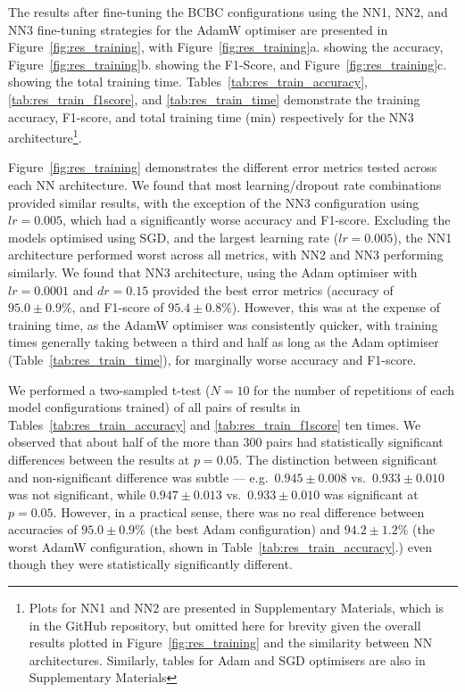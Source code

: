 \documentclass[a4paper,12pt]{article}
\begin{document}
The results after fine-tuning the \ac{BCBC} configurations using the \ac{NN1}, \ac{NN2}, and \ac{NN3} fine-tuning strategies for the AdamW optimiser are presented in Figure~\ref{fig:res_training}, with Figure~\ref{fig:res_training}a. showing the accuracy, Figure~\ref{fig:res_training}b. showing the F1-Score, and Figure~\ref{fig:res_training}c. showing the total training time. Tables~\ref{tab:res_train_accuracy}, \ref{tab:res_train_f1score}, and \ref{tab:res_train_time} demonstrate the training accuracy, F1-score, and total training time (min) respectively for the \ac{NN3} architecture\footnote{Plots for \ac{NN1} and \ac{NN2} are presented in Supplementary Materials, which is in the GitHub repository, but omitted here for brevity given the overall results plotted in Figure~\ref{fig:res_training} and the similarity between \ac{NN} architectures. Similarly, tables for Adam and SGD optimisers are also in Supplementary Materials}. 

Figure~\ref{fig:res_training} demonstrates the different error metrics tested across each \ac{NN} architecture. We found that most learning/dropout rate combinations provided similar 
results, with the exception of the \ac{NN3} configuration using $lr = 0.005$, which had a significantly worse accuracy and F1-score. Excluding the models optimised using SGD, and the largest learning rate ($lr = 0.005$), the \ac{NN1} architecture performed worst across all metrics, with \ac{NN2} and \ac{NN3} performing similarly. We found that \ac{NN3} architecture, using the Adam optimiser with $lr = 0.0001$ and $dr = 0.15$ provided the best error metrics (accuracy of $95.0 \pm 0.9 \%$, and F1-score of $95.4 \pm 0.8\%$). However, this was at the expense of training time, as the AdamW optimiser was consistently quicker, with training times generally taking between a third and half as long as the Adam optimiser (Table~\ref{tab:res_train_time}), for marginally worse accuracy and F1-score. 


We performed a two-sampled t-test ($N=10$ for the number of repetitions of each model configurations trained) of all pairs of results in Tables~\ref{tab:res_train_accuracy} and \ref{tab:res_train_f1score} ten times. We observed that about half of the more than 300 pairs had statistically significant differences between the results at $p = 0.05$. The distinction between significant and non-significant difference was subtle --- e.g.\ $0.945 \pm 0.008$ vs.\ $0.933 \pm 0.010$ was not significant, while $0.947 \pm 0.013$ vs.\ $0.933 \pm 0.010$ was significant at $p = 0.05$. 
However, in a practical sense, there was no real difference between accuracies of $95.0 \pm 0.9\%$ (the best Adam configuration) and $94.2 \pm 1.2\%$ (the worst AdamW configuration, shown in Table~\ref{tab:res_train_accuracy}.) even though they were statistically significantly different. 
\end{document}

